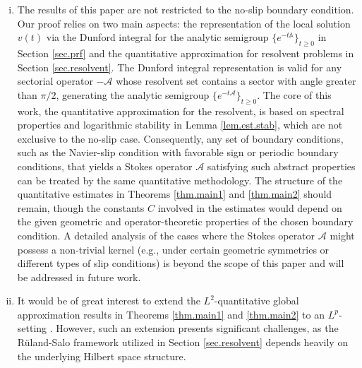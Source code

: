 \documentclass[11pt,a4paper]{article}
\numberwithin{equation}{section}
\begin{document}
\begin{remark}
\begin{enumerate}[(i)]
\item
The results of this paper are not restricted to the no-slip boundary condition. Our proof relies on two main aspects: the representation of the local solution $v(t)$ via the Dunford integral for the analytic semigroup $\{e^{-t {\mathbb A}}\}_{t\ge0}$ in Section \ref{sec.prf} and the quantitative approximation for resolvent problems in Section \ref{sec.resolvent}. The Dunford integral representation is valid for any sectorial operator $-\mathcal{A}$ whose resolvent set contains a sector with angle greater than $\pi/2$, generating the analytic semigroup $\{e^{-t \mathcal{A}}\}_{t\ge0}$. The core of this work, the quantitative approximation for the resolvent, is based on spectral properties and logarithmic stability in Lemma \ref{lem.est.stab}, which are not exclusive to the no-slip case. Consequently, any set of boundary conditions, such as the Navier-slip condition with favorable sign or periodic boundary conditions, that yields a Stokes operator $\mathcal{A}$ satisfying such abstract properties can be treated by the same quantitative methodology. The structure of the quantitative estimates in Theorems \ref{thm.main1} and \ref{thm.main2} should remain, though the constants $C$ involved in the estimates would depend on the given geometric and operator-theoretic properties of the chosen boundary condition. A detailed analysis of the cases where the Stokes operator $\mathcal{A}$ might possess a non-trivial kernel (e.g., under certain geometric symmetries or different types of slip conditions) is beyond the scope of this paper and will be addressed in future work. 


\item
It would be of great interest to extend the $L^2$-quantitative global approximation results in Theorems \ref{thm.main1} and \ref{thm.main2} to an $L^p$-setting \cite{Sol1977,Gig1981,AbeGig2013}. However, such an extension presents significant challenges, as the R\"{u}land-Salo framework utilized in Section \ref{sec.resolvent} depends heavily on the underlying Hilbert space structure. 
\end{enumerate}
\end{remark}
\end{document}

